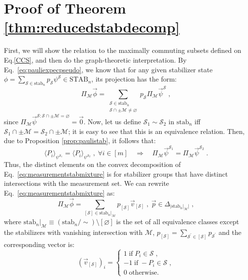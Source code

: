 \documentclass[10pt,aps,pra,twocolumn,floatfix,nofootinbib,superscriptaddress,longbibliography]{revtex4-2}
\newcommand{\1}{\mathbbm{1}}
\begin{document}
\section{Proof of Theorem \ref{thm:reducedstabdecomp} \label{proof:reducedstabdecomp}}
First, we will show the relation to the maximally commuting subsets defined on Eq.\eqref{CCS}, and then do the graph-theoretic interpretation. By Eq.~\eqref{eq:pauliexpecpseudo}, we know that for any given stabilizer state $\phi = \sum_{\mathcal S \in \mathrm{stab}_n}p_\mathcal S \psi^\mathcal S \in \mathrm{STAB}_n$, its projection has the form:
\begin{equation}
    \Pi_\mathcal M \vec{\phi} = \sum_{\substack{\mathcal S \in \mathrm{stab}_n\\\mathcal S \cap \pm \mathcal M \neq \varnothing}}p_\mathcal S \Pi_\mathcal M \vec{\psi}^\mathcal S\;,
    \label{eq:measurementstabmixture}
\end{equation}
since $\Pi_\mathcal M \vec{\psi}^{\mathcal S: \mathcal S\cap \pm \mathcal M =\varnothing} = \vec{0}$. Now, let us define $\mathcal S_1\sim\mathcal S_2$ in $\mathrm{stab}_n$ iff $\mathcal S_1 \cap \pm \mathcal M = \mathcal S_2 \cap \pm \mathcal M$; it is easy to see that this is an equivalence relation. Then, due to Proposition \ref{prop:paulistab}, it follows that:
\begin{equation}
    \langle P_i \rangle_{\psi^{\mathcal S_1}} = \langle P_i \rangle_{\psi^{\mathcal S_2}} \;,\; \forall i \in [m] \quad \Rightarrow \quad \Pi_\mathcal M \vec{\psi}^{\mathcal S_1} = \Pi_\mathcal M \vec{\psi}^{\mathcal S_2}\;.
\end{equation}
Thus, the distinct elements on the convex decomposition of Eq.~\eqref{eq:measurementstabmixture} is for stabilizer groups that have distinct intersections with the measurement set. We can rewrite Eq.~\eqref{eq:measurementstabmixture} as:
\begin{equation}
    \Pi_\mathcal M \vec{\phi} = \sum_{[\mathcal{S}] \in \mathrm{stab}_n|_\mathcal M }p_{[\mathcal{S}]} \vec{v}_{[\mathcal{S}]}\;,\; \vec{p}\in \Delta_{|\mathrm{stab}_n|_\mathcal M|}\;,
    \label{eq:convstabM}
\end{equation}
where $\mathrm{stab}_n|_\mathcal M\equiv \left(\mathrm{stab}_n/\sim \right) \setminus[\varnothing]$ is the set of all equivalence classes except the stabilizers with vanishing intersection with $\mathcal{M}$, $p_{[\mathcal{S}]}=\sum_{\mathcal{S}^\prime\in [\mathcal{S}]}p_{\mathcal{S}^\prime}$  and the corresponding vector is:
    \begin{equation}
    (\vec  v_{[\mathcal{S}]})_i =  
    \begin{cases}
1 \; \mathrm{if\;} P_i \in \mathcal{S}\;,\\
-1 \; \mathrm{if\;}-P_i \in \mathcal{S}\;,\\
0\;\mathrm{otherwise.}
    \end{cases}
    \end{equation}
\end{document}
